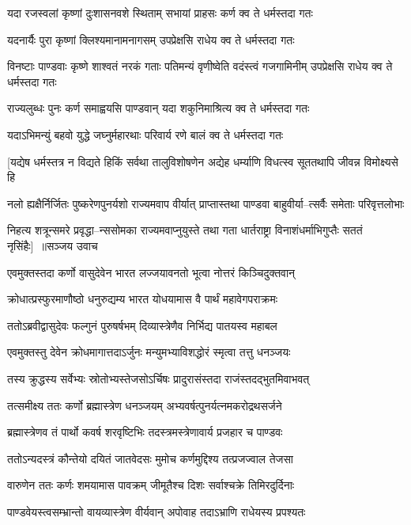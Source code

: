 \twolineshloka
{यदा रजस्वलां कृष्णां दुःशासनवशे स्थिताम्}
{सभायां प्राहसः कर्ण क्व ते धर्मस्तदा गतः}


\twolineshloka
{यदनार्यैः पुरा कृष्णां क्लिश्यमानामनागसम्}
{उपप्रेक्षसि राधेय क्व ते धर्मस्तदा गतः}


\threelineshloka
{विनष्टाः पाण्डवाः कृष्णे शाश्वतं नरकं गताः}
{पतिमन्यं वृणीष्वेति वदंस्त्वं गजगामिनीम्}
{उपप्रेक्षसि राधेय क्व ते धर्मस्तदा गतः}


\twolineshloka
{राज्यलुब्धः पुनः कर्ण समाह्वयसि पाण्डवान्}
{यदा शकुनिमाश्रित्य क्व ते धर्मस्तदा गतः}


\twolineshloka
{यदाऽभिमन्युं बहवो युद्धे जघ्नुर्महारथाः}
{परिवार्य रणे बालं क्व ते धर्मस्तदा गतः}


\twolineshloka
{[यद्येष धर्मस्तत्र न विद्यते हिकिं सर्वथा तालुविशोषणेन}
{अद्येह धर्म्याणि विधत्स्व सूततथापि जीवन्न विमोक्ष्यसे हि}


\twolineshloka
{नलो ह्यक्षैर्निर्जितः पुष्करेणपुनर्यशो राज्यमवाप वीर्यात्}
{प्राप्तास्तथा पाण्डवा बाहुवीर्या--त्सर्वैः समेताः परिवृत्तलोभाः}


\threelineshloka
{निहत्य शत्रून्समरे प्रवृद्धा--न्ससोमका राज्यमवाप्नुयुस्ते}
{तथा गता धार्तराष्ट्रा विनाशंधर्माभिगुप्तैः सततं नृसिंहैः] ॥सञ्जय उवाच}
{}


\twolineshloka
{एवमुक्तस्तदा कर्णो वासुदेवेन भारत}
{लज्जयावनतो भूत्वा नोत्तरं किञ्चिदुक्तवान्}


\twolineshloka
{क्रोधात्प्रस्फुरमाणौष्ठो धनुरुद्यम्य भारत}
{योधयामास वै पार्थं महावेगपराक्रमः}


\twolineshloka
{ततोऽब्रवीद्वासुदेवः फल्गुनं पुरुषर्षभम्}
{दिव्यास्त्रेणैव निर्भिद्य पातयस्व महाबल}


\twolineshloka
{एवमुक्तस्तु देवेन क्रोधमागात्तदाऽर्जुनः}
{मन्युमभ्याविशद्धोरं स्मृत्वा तत्तु धनञ्जयः}


\twolineshloka
{तस्य क्रुद्धस्य सर्वेभ्यः स्रोतोभ्यस्तेजसोऽर्चिषः}
{प्रादुरासंस्तदा राजंस्तदद्भुतमिवाभवत्}


\twolineshloka
{तत्समीक्ष्य ततः कर्णो ब्रह्मास्त्रेण धनञ्जयम्}
{अभ्यवर्षत्पुनर्यत्नमकरोद्रथसर्जने}


\twolineshloka
{ब्रह्मास्त्रेणव तं पार्थो कवर्ष शरवृष्टिभिः}
{तदस्त्रमस्त्रेणावार्य प्रजहार च पाण्डवः}


\twolineshloka
{ततोऽन्यदस्त्रं कौन्तेयो दयितं जातवेदसः}
{मुमोच कर्णमुद्दिश्य तत्प्रजज्वाल तेजसा}


\twolineshloka
{वारुणेन ततः कर्णः शमयामास पावक्रम्}
{जीमूतैश्च दिशः सर्वाश्चक्रे तिमिरदुर्दिनाः}


\twolineshloka
{पाण्डवेयस्त्वसम्भ्रान्तो वायव्यास्त्रेण वीर्यवान्}
{अपोवाह तदाऽभ्राणि राधेयस्य प्रपश्यतः}


